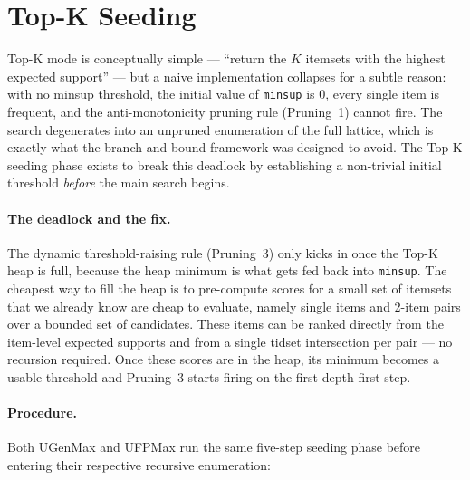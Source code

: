 \documentclass[12pt,a4paper]{report}
\begin{document}
  \section{Top-K Seeding}

  Top-K mode is conceptually simple --- ``return the $K$ itemsets with the highest expected support'' --- but a naive implementation collapses for a subtle reason: with no minsup threshold, the initial value of \texttt{minsup} is $0$, every single item is frequent, and the anti-monotonicity pruning rule (Pruning~1) cannot fire. The search degenerates into an unpruned enumeration of the full lattice, which is exactly what the branch-and-bound framework was designed to avoid. The Top-K seeding phase exists to break this deadlock by establishing a non-trivial initial threshold \emph{before} the main search begins.

  \paragraph{The deadlock and the fix.} The dynamic threshold-raising rule (Pruning~3) only kicks in once the Top-K heap is full, because the heap minimum is what gets fed back into \texttt{minsup}. The cheapest way to fill the heap is to pre-compute scores for a small set of itemsets that we already know are cheap to evaluate, namely single items and 2-item pairs over a bounded set of candidates. These items can be ranked directly from the item-level expected supports and from a single tidset intersection per pair --- no recursion required. Once these scores are in the heap, its minimum becomes a usable threshold and Pruning~3 starts firing on the first depth-first step.

  \paragraph{Procedure.} Both UGenMax and UFPMax run the same five-step seeding phase before entering their respective recursive enumeration:
\end{document}
